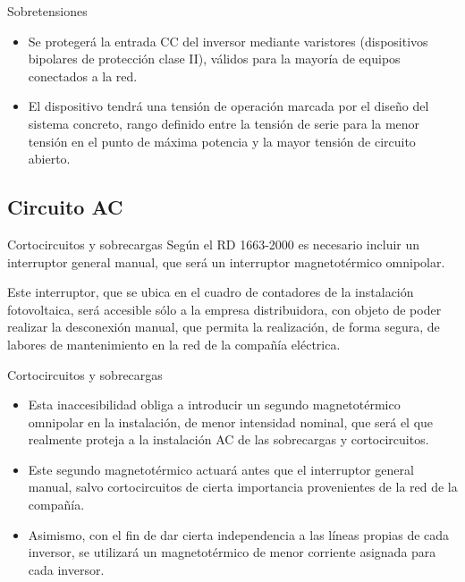 \documentclass[xcolor={usenames,svgnames,dvipsnames}]{beamer}
\begin{document}
\begin{frame}[label=sec-5-1-9]{Sobretensiones}
\begin{itemize}
\item Se protegerá la entrada CC del inversor mediante \alert{varistores}
(dispositivos bipolares de protección clase II), válidos para la
mayoría de equipos conectados a la red.

\item El dispositivo tendrá una tensión de operación marcada por el diseño
del sistema concreto, rango definido entre la tensión de serie para
la menor tensión en el punto de máxima potencia y la mayor tensión de
circuito abierto.
\end{itemize}
\end{frame}

\subsection{Circuito AC}
\label{sec-5-2}

\begin{frame}[label=sec-5-2-1]{Cortocircuitos y sobrecargas}
Según el RD 1663-2000 es necesario incluir un \alert{interruptor general
manual}, que será un interruptor magnetotérmico omnipolar.

Este interruptor, que se ubica en el cuadro de contadores de la
instalación fotovoltaica, será \alert{accesible sólo a la empresa
distribuidora}, con objeto de poder realizar la desconexión manual, que
permita la realización, de forma segura, de labores de mantenimiento en
la red de la compañía eléctrica.
\end{frame}

\begin{frame}[label=sec-5-2-2]{Cortocircuitos y sobrecargas}
\begin{itemize}
\item Esta inaccesibilidad obliga a introducir un \alert{segundo magnetotérmico
omnipolar} en la instalación, de menor intensidad nominal, que será
el que realmente proteja a la instalación AC de las sobrecargas y
cortocircuitos.

\item Este segundo magnetotérmico actuará antes que el interruptor general
manual, salvo cortocircuitos de cierta importancia provenientes de la
red de la compañía.

\item Asimismo, con el fin de dar cierta independencia a las líneas propias
de cada inversor, se utilizará un magnetotérmico de menor corriente
asignada para cada inversor.
\end{itemize}
\end{frame}
\end{document}
